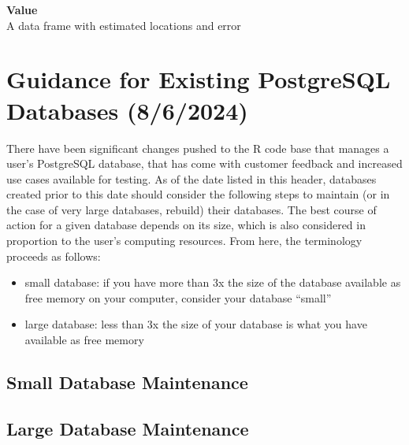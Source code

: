 \documentclass[
]{book}
\providecommand{\tightlist}{%
  \setlength{\itemsep}{0pt}\setlength{\parskip}{0pt}}
\begin{document}
\textbf{Value}\\
A data frame with estimated locations and error

\chapter{Guidance for Existing PostgreSQL Databases (8/6/2024)}\label{guidance-for-existing-postgresql-databases-862024}

There have been significant changes pushed to the R code base that manages a user's PostgreSQL database, that has come with customer feedback and increased use cases available for testing. As of the date listed in this header, databases created prior to this date should consider the following steps to maintain (or in the case of very large databases, rebuild) their databases. The best course of action for a given database depends on its size, which is also considered in proportion to the user's computing resources. From here, the terminology proceeds as follows:

\begin{itemize}
\tightlist
\item
  small database: if you have more than 3x the size of the database available as free memory on your computer, consider your database ``small''\\
\item
  large database: less than 3x the size of your database is what you have available as free memory
\end{itemize}

\section{Small Database Maintenance}\label{small-database-maintenance}

\section{Large Database Maintenance}\label{large-database-maintenance}

  
\end{document}
